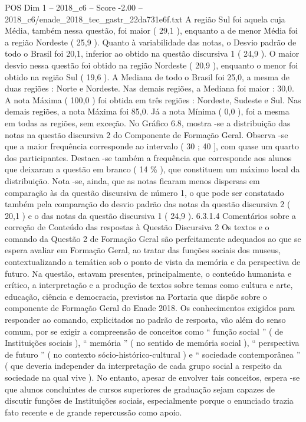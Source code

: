 \begin{textsample}{POS Dim 1 – 2018\_c6 – Score -2.00 – 2018\_c6/enade\_2018\_tec\_gastr\_22da731e6f.txt}
A região Sul foi aquela cuja Média, também nessa questão, foi maior ( 29,1 ), enquanto a de menor Média foi a região Nordeste ( 25,9 ).
Quanto à variabilidade das notas, o Desvio padrão de todo o Brasil foi 20,1, inferior ao obtido na questão discursiva 1 ( 24,9 ).
O maior desvio nessa questão foi obtido na região Nordeste ( 20,9 ), enquanto o menor foi obtido na região Sul ( 19,6 ).
A Mediana de todo o Brasil foi 25,0, a mesma de duas regiões : Norte e Nordeste.
Nas demais regiões, a Mediana foi maior : 30,0.
A nota Máxima ( 100,0 ) foi obtida em três regiões : Nordeste, Sudeste e Sul.
Nas demais regiões, a nota Máxima foi 85,0.
Já a nota Mínima ( 0,0 ), foi a mesma em todas as regiões, sem exceção.
No Gráfico 6.8, mostra -se a distribuição das notas na questão discursiva 2 do Componente de Formação Geral.
Observa -se que a maior frequência corresponde ao intervalo ( 30 ; 40 ], com quase um quarto dos participantes.
Destaca -se também a frequência que corresponde aos alunos que deixaram a questão em branco ( 14 \% ), que constituem um máximo local da distribuição.
Nota -se, ainda, que as notas ficaram menos dispersas em comparação às da questão discursiva de número 1, o que pode ser constatado também pela comparação do desvio padrão das notas da questão discursiva 2 ( 20,1 ) e o das notas da questão discursiva 1 ( 24,9 ). 6.3.1.4 Comentários sobre a correção de Conteúdo das respostas à Questão Discursiva 2 Os textos e o comando da Questão 2 de Formação Geral são perfeitamente adequados ao que se espera avaliar em Formação Geral, ao tratar das funções sociais dos museus, contextualizando a temática sob o ponto de vista da memória e da perspectiva de futuro.
Na questão, estavam presentes, principalmente, o conteúdo humanista e crítico, a interpretação e a produção de textos sobre temas como cultura e arte, educação, ciência e democracia, previstos na Portaria que dispõe sobre o componente de Formação Geral do Enade 2018.
Os conhecimentos exigidos para responder ao comando, explicitados no padrão de resposta, vão além do senso comum, por se exigir a compreensão de conceitos como “ função social ” ( de Instituições sociais ), “ memória ” ( no sentido de memória social ), “ perspectiva de futuro ” ( no contexto sócio-histórico-cultural ) e “ sociedade contemporânea ” ( que deveria independer da interpretação de cada grupo social a respeito da sociedade na qual vive ).
No entanto, apesar de envolver tais conceitos, espera -se que alunos concluintes de cursos superiores de graduação sejam capazes de discutir funções de Instituições sociais, especialmente porque o enunciado trazia fato recente e de grande repercussão como apoio.

\end{textsample}
